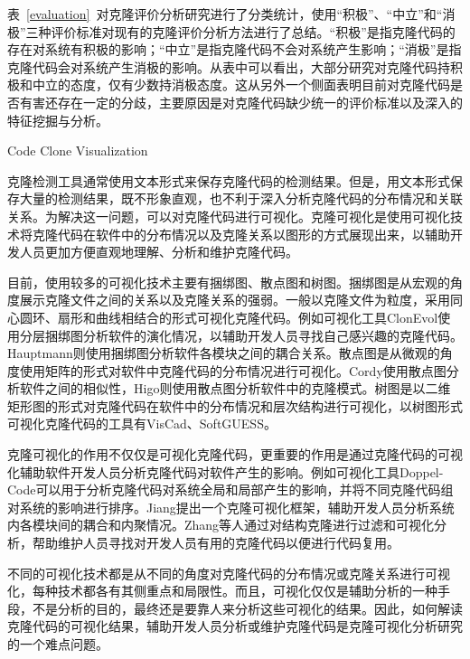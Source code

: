 表~\ref{evaluation}~对克隆评价分析研究进行了分类统计，使用“积极”、“中立”和“消极”三种评价标准对现有的克隆评价分析方法进行了总结。“积极”是指克隆代码的存在对系统有积极的影响；“中立”是指克隆代码不会对系统产生影响；“消极”是指克隆代码会对系统产生消极的影响。从表中可以看出，大部分研究对克隆代码持积极和中立的态度，仅有少数持消极态度。这从另外一个侧面表明目前对克隆代码是否有害还存在一定的分歧，主要原因是对克隆代码缺少统一的评价标准以及深入的特征挖掘与分析。

{Code Clone Visualization}

克隆检测工具通常使用文本形式来保存克隆代码的检测结果。但是，用文本形式保存大量的检测结果，既不形象直观，也不利于深入分析克隆代码的分布情况和关联关系。为解决这一问题，可以对克隆代码进行可视化。克隆可视化是使用可视化技术将克隆代码在软件中的分布情况以及克隆关系以图形的方式展现出来，以辅助开发人员更加方便直观地理解、分析和维护克隆代码。

目前，使用较多的可视化技术主要有捆绑图、散点图和树图。捆绑图是从宏观的角度展示克隆文件之间的关系以及克隆关系的强弱。一般以克隆文件为粒度，采用同心圆环、扇形和曲线相结合的形式可视化克隆代码\cite{hanjalic2013clonevol}\cite{hauptmann2012using}\cite{voinea2014visual}。例如可视化工具ClonEvol使用分层捆绑图分析软件的演化情况，以辅助开发人员寻找自己感兴趣的克隆代码\cite{hanjalic2013clonevol}。Hauptmann则使用捆绑图分析软件各模块之间的耦合关系\cite{hauptmann2012using}。散点图是从微观的角度使用矩阵的形式对软件中克隆代码的分布情况进行可视化\cite{cordy2011exploring}\cite{higo2007method}\cite{livieri2007very}。Cordy使用散点图分析软件之间的相似性\cite{cordy2011exploring}，Higo则使用散点图分析软件中的克隆模式\cite{higo2007method}\cite{livieri2007very}。树图是以二维矩形图的形式对克隆代码在软件中的分布情况和层次结构进行可视化，以树图形式可视化克隆代码的工具有VisCad\cite{asaduzzaman2011viscad}、SoftGUESS\cite{adar2007softguess}。

克隆可视化的作用不仅仅是可视化克隆代码，更重要的作用是通过克隆代码的可视化辅助软件开发人员分析克隆代码对软件产生的影响。例如可视化工具Doppel-Code可以用于分析克隆代码对系统全局和局部产生的影响，并将不同克隆代码组对系统的影响进行排序\cite{forbes2012doppel}。Jiang提出一个克隆可视化框架，辅助开发人员分析系统内各模块间的耦合和内聚情况\cite{jiang2007framework}\cite{jiang2006visualizing}。Zhang等人通过对结构克隆进行过滤和可视化分析，帮助维护人员寻找对开发人员有用的克隆代码以便进行代码复用\cite{zhang2008query}。

不同的可视化技术都是从不同的角度对克隆代码的分布情况或克隆关系进行可视化，每种技术都各有其侧重点和局限性。而且，可视化仅仅是辅助分析的一种手段，不是分析的目的，最终还是要靠人来分析这些可视化的结果。因此，如何解读克隆代码的可视化结果，辅助开发人员分析或维护克隆代码是克隆可视化分析研究的一个难点问题。

